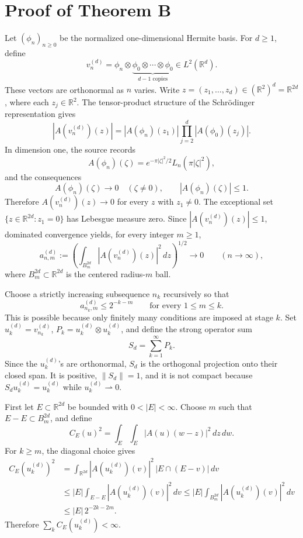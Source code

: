\documentclass[11pt]{amsart}
\newcommand{\R}{\mathbb R}
\newcommand{\dd}{\,d}
\begin{document}
\section*{Proof of Theorem B}

Let \((\phi_n)_{n\ge0}\) be the normalized one-dimensional Hermite basis.  For \(d\ge1\), define
\[
v_n^{(d)}=\phi_n\otimes\underbrace{\phi_0\otimes\cdots\otimes\phi_0}_{d-1\text{ copies}}
\in L^2(\R^d).
\]
These vectors are orthonormal as \(n\) varies.  Write \(z=(z_1,\ldots,z_d)\in(\R^2)^d=\R^{2d}\), where each \(z_j\in\R^2\).  The tensor-product structure of the Schrödinger representation gives
\[
|A(v_n^{(d)})(z)|
=|A(\phi_n)(z_1)|\prod_{j=2}^d |A(\phi_0)(z_j)|.
\]
In dimension one, the source records
\[
A(\phi_n)(\zeta)=e^{-\pi |\zeta|^2/2}L_n(\pi |\zeta|^2),
\]
and the consequences
\[
A(\phi_n)(\zeta)\to0\quad(\zeta\ne0),\qquad |A(\phi_n)(\zeta)|\le1.
\]
Therefore \(A(v_n^{(d)})(z)\to0\) for every \(z\) with \(z_1\ne0\).  The exceptional set \(\{z\in\R^{2d}:z_1=0\}\) has Lebesgue measure zero.  Since \(|A(v_n^{(d)})(z)|\le1\), dominated convergence yields, for every integer \(m\ge1\),
\[
a_{n,m}^{(d)}:=
\left(\int_{B_m^{2d}}|A(v_n^{(d)})(z)|^2\dd z\right)^{1/2}
\longrightarrow0
\qquad(n\to\infty),
\]
where \(B_m^{2d}\subset\R^{2d}\) is the centered radius-\(m\) ball.

Choose a strictly increasing subsequence \(n_k\) recursively so that
\[
a_{n_k,m}^{(d)}\le 2^{-k-m}\qquad\text{for every }1\le m\le k .
\]
This is possible because only finitely many conditions are imposed at stage \(k\).  Set \(u_k^{(d)}=v_{n_k}^{(d)}\), \(P_k=u_k^{(d)}\otimes u_k^{(d)}\), and define the strong operator sum
\[
S_d=\sum_{k=1}^\infty P_k .
\]
Since the \(u_k^{(d)}\)'s are orthonormal, \(S_d\) is the orthogonal projection onto their closed span.  It is positive, \(\|S_d\|=1\), and it is not compact because \(S_du_k^{(d)}=u_k^{(d)}\) while \(u_k^{(d)}\rightharpoonup0\).

First let \(E\subset\R^{2d}\) be bounded with \(0<|E|<\infty\).  Choose \(m\) such that \(E-E\subset B_m^{2d}\), and define
\[
C_E(u)^2=\int_E\int_E |A(u)(w-z)|^2\dd z\dd w .
\]
For \(k\ge m\), the diagonal choice gives
\[
\begin{aligned}
C_E(u_k^{(d)})^2
&=\int_{\R^{2d}}|A(u_k^{(d)})(v)|^2\,|E\cap(E-v)|\dd v\\
&\le |E|\int_{E-E}|A(u_k^{(d)})(v)|^2\dd v
\le |E|\int_{B_m^{2d}}|A(u_k^{(d)})(v)|^2\dd v\\
&\le |E|\,2^{-2k-2m}.
\end{aligned}
\]
Therefore \(\sum_k C_E(u_k^{(d)})<\infty\).
\end{document}
